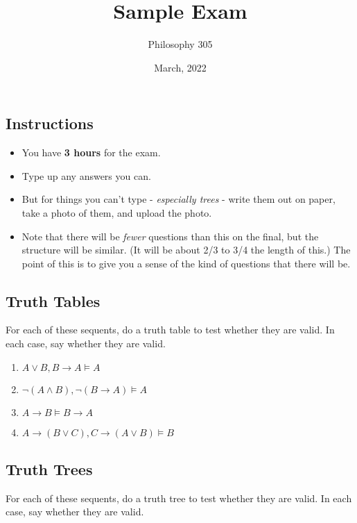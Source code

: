 \documentclass[
  11pt,
]{article}
\title{Sample Exam}
\author{Philosophy 305}
\date{March, 2022}
\providecommand{\tightlist}{%
  \setlength{\itemsep}{0pt}\setlength{\parskip}{0pt}}
\begin{document}
\maketitle

\hypertarget{instructions}{%
\subsection{Instructions}\label{instructions}}

\begin{itemize}
\tightlist
\item
  You have \textbf{3 hours} for the exam.
\item
  Type up any answers you can.
\item
  But for things you can't type - \emph{especially trees} - write them
  out on paper, take a photo of them, and upload the photo.
\item
  Note that there will be \emph{fewer} questions than this on the final,
  but the structure will be similar. (It will be about 2/3 to 3/4 the
  length of this.) The point of this is to give you a sense of the kind
  of questions that there will be.
\end{itemize}

\hypertarget{truth-tables}{%
\subsection{Truth Tables}\label{truth-tables}}

For each of these sequents, do a truth table to test whether they are
valid. In each case, say whether they are valid.

\begin{enumerate}
\def\labelenumi{\arabic{enumi}.}
\tightlist
\item
  \(A \vee B, B \rightarrow A \vDash A\)
\item
  \(\neg (A \wedge B), \neg (B \rightarrow A) \vDash A\)
\item
  \(A \rightarrow B \vDash B \rightarrow A\)
\item
  \(A \rightarrow (B \vee C), C \rightarrow (A \vee B) \vDash B\)
\end{enumerate}

\hypertarget{truth-trees}{%
\subsection{Truth Trees}\label{truth-trees}}

For each of these sequents, do a truth tree to test whether they are
valid. In each case, say whether they are valid.
\end{document}
